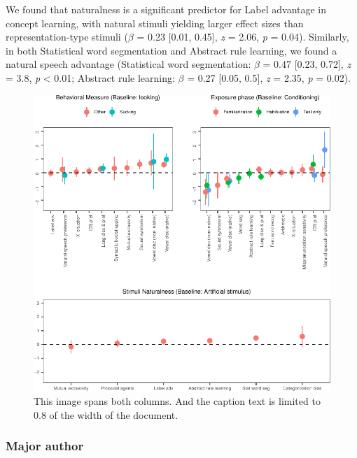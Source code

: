 \documentclass[10pt, letterpaper]{article}
\newenvironment{CodeChunk}{}{}
\begin{document}
We found that naturalness is a significant predictor for Label advantage
in concept learning, with natural stimuli yielding larger effect sizes
than representation-type stimuli (\(\beta\) = 0.23 {[}0.01, 0.45{]},
\emph{z} = 2.06, \emph{p} = 0.04). Similarly, in both Statistical word
segmentation and Abstract rule learning, we found a natural speech
advantage (Statistical word segmentation: \(\beta\) = 0.47 {[}0.23,
0.72{]}, \emph{z} = 3.8, \emph{p} \textless{} 0.01; Abstract rule
learning: \(\beta\) = 0.27 {[}0.05, 0.5{]}, \emph{z} = 2.35, \emph{p} =
0.02).

\begin{CodeChunk}
\begin{figure}[h]

{\centering \includegraphics{figs/2-col-image-1} 

}

\caption[This image spans both columns]{This image spans both columns. And the caption text is limited to 0.8 of the width of the document.}\label{fig:2-col-image}
\end{figure}
\end{CodeChunk}

\hypertarget{major-author}{%
\subsubsection{Major author}\label{major-author}}
\end{document}
